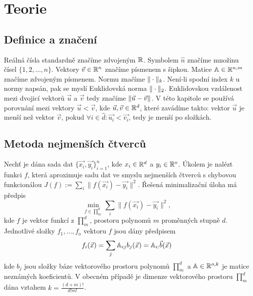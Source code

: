 \chapter{Teorie}

\section{Definice a značení}

Reálná čísla standardně značíme zdvojeným $\mathbb{R}$. Symbolem $\hat n$ značíme množinu čísel $\{1, 2, \ldots, n\}$. Vektory $\vec{v} \in \mathbb{R}^n$ značíme písmenem s šipkou. Matice $\mathbb{A} \in \mathbb{R}^{n, m}$ značíme zdvojeným písmenem. Normu značíme $\|\cdot\|_k$. Není-li spodní index $k$ u normy napsán, pak se myslí Euklidovská norma $\|\cdot\|_2$. Euklidovskou vzdálenost mezi dvojicí vektorů $\vec{u}$ a $\vec{v}$ tedy značíme $\|\vec{u} - \vec{v}\|$. V této kapitole se používá porovnání mezi vektory $\vec{u} < \vec{v}$, kde $\vec{u}, \vec{v} \in \mathbb{R}^d$, které zavádíme takto: vektor $\vec{u}$ je menší než vektor $\vec{v}$, pokud $\forall i \in \hat{d}: \vec{u_i} < \vec{v_i}$, tedy je menší po složkách.

\section{Metoda nejmenších čtverců}

Nechť je dána sada dat $\{\vec{x_i}, \vec{y_i}\}_{i = 1}^n$, kde $x_i \in \mathbb{R}^d$ a $y_i \in \mathbb{R}^o$. Úkolem je nalézt funkci $f$, která aproximuje sadu dat ve smyslu nejmenších čtverců s chybovou funkcionálou $J(f) := \sum_i \| f(\vec{x_i}) - \vec{y_i} \|^2$. Řešená minimalizační úloha má předpis
\label{def:ls-min}
\begin{equation}
  \min_{f \in \prod^{d}_{m}}\sum_i \| f(\vec{x_i}) - \vec{y_i} \|^2,
\end{equation}
kde $f$ je vektor funkcí z $\prod^{d}_{m}$, prostoru polynomů $m$ proměnných stupně $d$. Jednotlivé složky $f_1, \ldots, f_o$ vektoru $f$ jsou dány předpisem
\label{def:ls-f}
\begin{equation}
  f_i(\vec{x}) = \sum_{j} \mathbb{A}_{ij}b_j(\vec{x}) = \mathbb{A}_{i:}\vec{b}(\vec{x})
\end{equation}
kde $b_j$ jsou složky báze vektorového prostoru polynomů $\prod^d_m$ a $\mathbb{A} \in \mathbb{R}^{o, k}$ je matice neznámých koeficientů. V obecném případě je dimenze vektorového prostoru $\prod^d_m$ dána vztahem $k = \frac{(d+m)!}{d!m!}$.\cite{mwls-approximation-power, classification-of-meshfree}


